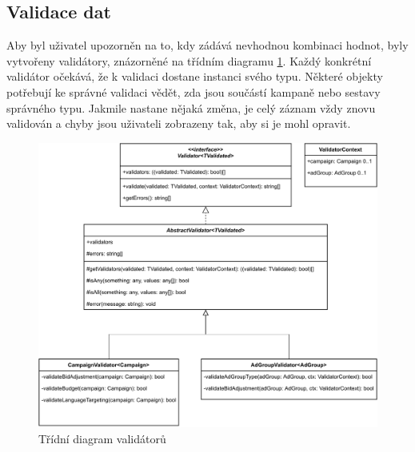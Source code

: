 \subsection{Validace dat}
Aby byl uživatel upozorněn na to, kdy zádává nevhodnou kombinaci hodnot, byly vytvořeny validátory, znázorněné na třídním diagramu \ref{fig:validators}. Každý konkrétní validátor
očekává, že k validaci dostane instanci svého typu. Některé objekty potřebují ke správné validaci vědět, zda jsou součástí kampaně nebo sestavy správného typu.
Jakmile nastane nějaká změna, je celý záznam vždy znovu validován a chyby jsou uživateli zobrazeny tak, aby si je mohl opravit.

\begin{figure}[h]
    \centering
    \includegraphics[width=.8\textwidth]{Figures/Validators.pdf}
    \caption{Třídní diagram validátorů}
    \label{fig:validators}
\end{figure}

